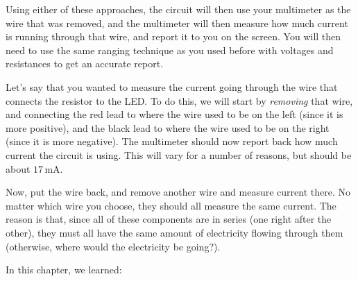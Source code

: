 Using either of these approaches, the circuit will then use your multimeter as the wire that was removed, and the multimeter will then measure how much current is running through that wire, and report it to you on the screen.
You will then need to use the same ranging technique as you used before with voltages and resistances to get an accurate report.

Let's say that you wanted to measure the current going through the wire that connects the resistor to the LED.
To do this, we will start by \emph{removing} that wire, and connecting the red lead to where the wire used to be on the left (since it is more positive), and the black lead to where the wire used to be on the right (since it is more negative).
The multimeter should now report back how much current the circuit is using.  
This will vary for a number of reasons, but should be about $17\,\si{\milli\ampere}$.

Now, put the wire back, and remove another wire and measure current there.
No matter which wire you choose, they should all measure the same current.
The reason is that, since all of these components are in series (one right after the other), they must all have the same amount of electricity flowing through them (otherwise, where would the electricity be going?).

\reviewsection

In this chapter, we learned:

